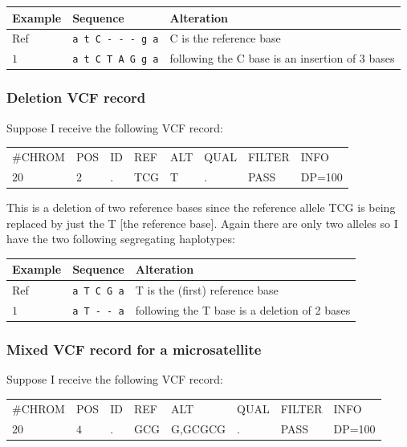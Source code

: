 \documentclass[8pt]{article}
\begin{document}
\vspace{0.3cm}
\begin{tabular}{ | l | l | l | }
\hline
Example & Sequence & Alteration \\ \hline
Ref & \verb|a t C - - - g a| & C is the reference base \\ \hline
$1$ & \verb|a t C T A G g a| & following the C base is an insertion of 3 bases \\ \hline
\end{tabular}

\subsubsection{Deletion VCF record}
Suppose I receive the following VCF record:

\vspace{0.3cm}
\begin{tabular}{ l l l l l l l l}
	\#CHROM & POS & ID & REF & ALT & QUAL & FILTER & INFO \\
	$20$ & $2$ & . & TCG & T & . & PASS & DP=100 \\
\end{tabular}
\vspace{0.3cm}

This is a deletion of two reference bases since the reference allele TCG is being replaced by just the T [the reference base].
Again there are only two alleles so I have the two following segregating haplotypes:

\vspace{0.3cm}
\begin{tabular}{ | l | l | l | }
\hline
Example & Sequence & Alteration \\ \hline
Ref & \verb|a T C G a| & T is the (first) reference base \\ \hline
$1$ & \verb|a T - - a| & following the T base is a deletion of 2 bases \\ \hline
\end{tabular}

\subsubsection{Mixed VCF record for a microsatellite}
Suppose I receive the following VCF record:

\vspace{0.3cm}
\begin{tabular}{ l l l l l l l l}
	\#CHROM & POS & ID & REF & ALT & QUAL & FILTER & INFO \\
	$20$ & $4$ & . & GCG & G,GCGCG & . & PASS & DP=100 \\
\end{tabular}
\vspace{0.3cm}
\end{document}
